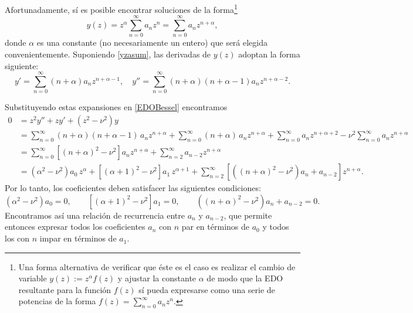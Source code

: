 Afortunadamente, sí es posible encontrar soluciones de la forma\footnote{Una forma alternativa de verificar que éste es el caso es realizar el cambio de variable $y(z):=z^\alpha f(z)$ y ajustar la constante $\alpha$ de modo que la EDO resultante para la función $f(z)$ sí pueda expresarse como una serie de potencias de la forma $f(z) = \sum_{n=0}^\infty a_n z^n$.}
\begin{equation}\label{yzasum}
y(z) = z^\alpha \sum_{n=0}^\infty a_n z^n = \sum_{n=0}^\infty a_n z^{n+\alpha},
\end{equation}
donde $\alpha$ es una constante (no necesariamente un entero) que será elegida convenientemente. Suponiendo \eqref{yzasum}, las derivadas de $y(z)$ adoptan la forma siguiente:
\begin{equation}
y' = \sum_{n=0}^\infty (n+\alpha) a_n z^{n+\alpha-1}, \quad
y'' = \sum_{n=0}^\infty (n+\alpha)(n+\alpha-1) a_n z^{n+\alpha-2}.
\end{equation}

Substituyendo estas expansiones en \eqref{EDOBessel} encontramos
\begin{align}
0 &=  z^2 y'' + z y' + \left( z^2 - \nu^2 \right) y  \\
  &= \sum_{n=0}^\infty (n+\alpha)(n +\alpha - 1)\, a_n z^{n+\alpha}
  + \sum_{n=0}^\infty (n+\alpha)\, a_n z^{n+\alpha} + \sum_{n=0}^\infty a_n z^{n+\alpha+2}
  - \nu^2\sum_{n=0}^\infty a_n z^{n+\alpha}  \\
 &=  \sum_{n=0}^\infty \left[ (n+\alpha)^2 -\nu^2 \right] a_n z^{n+\alpha}
  + \sum_{n=2}^\infty a_{n-2} z^{n+\alpha} \\
 &= (\alpha^2-\nu^2)a_0\,z^\alpha+\left[ (\alpha+1)^2 -\nu^2 \right] a_1\,z^{\alpha+1}
 + \sum_{n=2}^\infty \left[ \left( (n+\alpha)^2 -\nu^2 \right) a_n+a_{n-2}\right]  z^{n+\alpha}.
\end{align}
Por lo tanto, los coeficientes deben satisfacer las siguientes condiciones:
\begin{equation}\label{rrBess}
(\alpha^2-\nu^2)a_0=0,  \qquad \left[ (\alpha+1)^2 -\nu^2 \right] a_1=0, \qquad 
\left( (n+\alpha)^2 -\nu^2 \right) a_n+a_{n-2}=0.
\end{equation}
Encontramos así una relación de recurrencia entre $a_n$ y $a_{n-2}$, que permite entonces expresar todos los coeficientes $a_n$ con $n$ par en términos de $a_0$ y todos los con $n$ impar en términos de $a_1$. 

